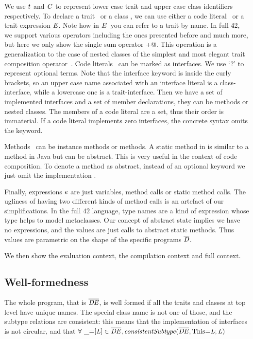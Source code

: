 We use $\mathit{t}$ and $\mathit{C}$ to represent lower case trait and upper case class identifiers respectively.
To declare a trait \mTD\ or a class \mCD, we can use either a code literal \mL\ or a trait
expression $\mathit{E}$. Note how in $\mathit{E}$\ you can refer to a trait by name.
In full 42, we support various operators including the ones presented before and much more,
 but here we only show the single sum operator \Q@+@.
This operation is a generalization to the case of nested classes of the simplest and most elegant
trait composition operator~\cite{ducasse2006traits}.
Code literals \mL\ can be marked as interfaces. We use `?' to represent optional terms.
Note that the interface keyword is inside the curly brackets,
so an upper case name associated with an interface literal is a class-interface, while a lowercase one is a trait-interface.
Then we have a set of implemented interfaces and a set of member
declarations, they can be methods or nested classes.
The members of a code literal are a set, thus their order is immaterial.
If a code literal implements zero interfaces, the concrete syntax omits the \Q@implements@ keyword.

Methods \mMD~can be instance methods or \Q@static@ methods. 
A static method in \name is similar to a \Q@static@ method in Java but can be abstract.
This is very useful in the context of code composition.
To denote a method as abstract, instead of an optional keyword we just omit the implementation \me.

Finally, expressions $\mathit{e}$ are just variables, method calls or static method calls.
The ugliness of having two different kinds of method calls is an artefact of our simplifications.
In the full 42 language, type names are a kind of expression whose type helps to model metaclasses.
Our concept of abstract state implies we have no \Q@new@ expressions, and
the values are just calls to abstract static methods.
Thus values are parametric on the shape of the specific programs $\overline{\mathit{D}}$.

We then show the evaluation context, the compilation context and full
context.

\subsection{Well-formedness}

The whole program, that is $\overline{\mathit{DE}}$, is well formed if
all the traits and classes at top level have unique names. The special class name
\Q@This@ is not one of those,
and the subtype relations are consistent:
this means that the implementation of interfaces is not circular,
and that $\forall\ \_\terminalCode{=}\ctx[\mL]\in\overline\mDE, \mathit{consistentSubtype}(\overline\mDE,\terminalCode{This=}\mL;\mL)$

